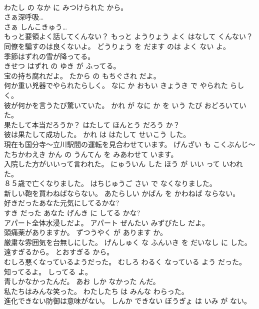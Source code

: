 \documentclass[8pt]{extreport}
\begin{document}
\begin{CJK}{UTF8}{min}
\\	わたし の なか に みつけられた から。	
\\	さぁ深呼吸…	
\\	さぁ しんこきゅう…	
\\	もっと要領よく話してくんない？	もっと ようりょう よく はなして くんない？	
\\	同僚を騙すのは良くないよ。	どうりょう を だます のは よく ない よ。	
\\	季節はずれの雪が降ってる。	
\\	きせつ はずれ の ゆき が ふってる。	
\\	宝の持ち腐れだよ。	たから の もちぐされ だよ。	
\\	何か重い兇器でやられたらしく。	なに か おもい きょうき で やられた らしく。	
\\	彼が何かを言うたび驚いていた。	かれ が なに か を いう たび おどろいていた。	
\\	果たして本当だろうか？	はたして ほんとう だろう か？	
\\	彼は果たして成功した。	かれ は はたして せいこう した。	
\\	現在も国分寺～立川駅間の運転を見合わせています。	げんざい も こくぶんじ～たちかわえき かん の うんてん を みあわせて います。	
\\	入院した方がいいって言われた。	にゅういん した ほう が いい って いわれた。	
\\	８５歳で亡くなりました。	はちじゅうご さい で なくなりました。	
\\	新しい鞄を買わねばならない。	あたらしい かばん を かわねば ならない。	
\\	好きだったあなた元気にしてるかな?	
\\	すき だった あなた げんき に してる かな?	
\\	アパート全体水浸しだよ。	アパート ぜんたい みずびたし だよ。	
\\	頭痛薬がありますか。	ずつうやく が あります か。	
\\	厳粛な雰囲気を台無しにした。	げんしゅく な ふんいき を だいなし に した。	
\\	遠すぎるから。	とおすぎる から。	
\\	むしろ悪くなっているようだった。	むしろ わるく なっている よう だった。	
\\	知ってるよ。	しってる よ。	
\\	青しかなかったんだ。	あお しか なかった んだ。	
\\	私たちはみんな笑った。	わたしたち は みんな わらった。	
\\	進化できない防御は意味がない。	しんか できない ぼうぎょ は いみ が ない。	

\end{CJK}
\end{document}

